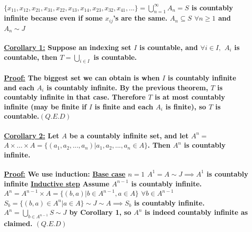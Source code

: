 \documentclass[10pt,a4paper]{article}
\begin{document}
 
\paragraph{$\lbrace x_{11},x_{12},x_{21},x_{31},x_{22},x_{13},x_{14},x_{23},
x_{32},x_{41},...\rbrace = \bigcup\limits_{n=1}^{\infty} A_{n} = S$ is countably infinite because even if some $x_{ij}$'s are the same.
\newline
$A_{n} \subseteq S$ $\forall n \geq 1 $ and $A_{n} \sim J$  }

\paragraph{\underline{Corollary 1:} Suppose an indexing set $I$ is countable, and $\forall i \in I,$
\newline 
 $A_{i}$ is countable, then $T =  \bigcup\limits_{i \in I}$ is countable.}
 
 \paragraph{\underline{Proof:} The biggest set we can obtain is when $I$ is countably infinite and each $A_{i}$ is countably infinite. By the previous theorem, $T$ is countably infinite in that case. Therefore $T$ is at most countably infinite (may be finite if $I$ is finite and each $A_{i}$ is finite), so $T$ is countable.$(Q.E.D)$}
 
 \paragraph{\underline{Corollary 2:} Let $A$ be a countably infinite set, and let $A^{n} =$ $A \times ... \times A = \lbrace (a_{1},a_{2},...,a_{n}) | a_{1},a_{2},...,a_{n} \in A \rbrace$. 
 \newline
 Then $A^{n}$ is countably infinite. 
}

\paragraph{\underline{Proof:} We use induction:
\newline 
\underline{Base case} $n = 1$ $A^{1} = A \sim J \implies A^{1}$ is countably infinite
\newline
\underline{Inductive step} Assume $A^{n-1}$ is countably infinite.
\newline 
$A^{n} = A^{n-1} \times A = \lbrace  (b,a) |  b \in A^{n-1}, a \in A\rbrace$
\newline 
$\forall b \in A^{n-1}$ $S_{b}  = \lbrace (b,a) \in A^{n} | a \in A \rbrace \sim J \sim A \implies S_{b}$ is countably infinite. $A^{n} = \bigcup\limits_{b \in A^{n-1}} S \sim J $ by Corollary 1, so $A^{n}$  is indeed countably infinite as claimed. $(Q.E.D)$ 
}
\end{document}
